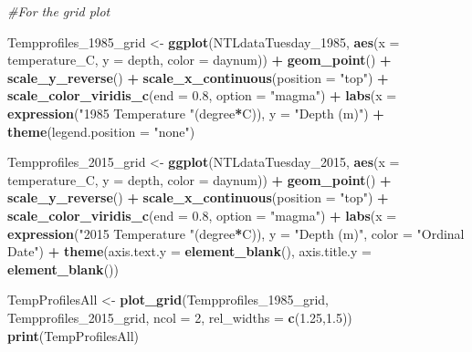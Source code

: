 \documentclass[]{article}
\newenvironment{Shaded}{\begin{snugshade}}{\end{snugshade}}
\newcommand{\CommentTok}[1]{\textcolor[rgb]{0.56,0.35,0.01}{\textit{#1}}}
\newcommand{\DataTypeTok}[1]{\textcolor[rgb]{0.13,0.29,0.53}{#1}}
\newcommand{\DecValTok}[1]{\textcolor[rgb]{0.00,0.00,0.81}{#1}}
\newcommand{\FloatTok}[1]{\textcolor[rgb]{0.00,0.00,0.81}{#1}}
\newcommand{\KeywordTok}[1]{\textcolor[rgb]{0.13,0.29,0.53}{\textbf{#1}}}
\newcommand{\NormalTok}[1]{#1}
\newcommand{\OperatorTok}[1]{\textcolor[rgb]{0.81,0.36,0.00}{\textbf{#1}}}
\newcommand{\StringTok}[1]{\textcolor[rgb]{0.31,0.60,0.02}{#1}}
\begin{document}
\begin{Shaded}
\begin{Highlighting}[]
\CommentTok{#For the grid plot}

\NormalTok{Tempprofiles_}\DecValTok{1985}\NormalTok{_grid <-}\StringTok{ }
\StringTok{  }\KeywordTok{ggplot}\NormalTok{(NTLdataTuesday_}\DecValTok{1985}\NormalTok{, }
         \KeywordTok{aes}\NormalTok{(}\DataTypeTok{x =}\NormalTok{ temperature_C, }\DataTypeTok{y =}\NormalTok{ depth, }\DataTypeTok{color =}\NormalTok{ daynum)) }\OperatorTok{+}
\StringTok{  }\KeywordTok{geom_point}\NormalTok{() }\OperatorTok{+}
\StringTok{  }\KeywordTok{scale_y_reverse}\NormalTok{() }\OperatorTok{+}
\StringTok{  }\KeywordTok{scale_x_continuous}\NormalTok{(}\DataTypeTok{position =} \StringTok{"top"}\NormalTok{) }\OperatorTok{+}
\StringTok{  }\KeywordTok{scale_color_viridis_c}\NormalTok{(}\DataTypeTok{end =} \FloatTok{0.8}\NormalTok{, }\DataTypeTok{option =} \StringTok{"magma"}\NormalTok{) }\OperatorTok{+}\StringTok{ }
\StringTok{  }\KeywordTok{labs}\NormalTok{(}\DataTypeTok{x =} \KeywordTok{expression}\NormalTok{(}\StringTok{"1985 Temperature "}\NormalTok{(degree}\OperatorTok{*}\NormalTok{C)), }\DataTypeTok{y =} \StringTok{"Depth (m)"}\NormalTok{) }\OperatorTok{+}
\StringTok{  }\KeywordTok{theme}\NormalTok{(}\DataTypeTok{legend.position =} \StringTok{"none"}\NormalTok{)}

\NormalTok{Tempprofiles_}\DecValTok{2015}\NormalTok{_grid <-}\StringTok{ }
\StringTok{  }\KeywordTok{ggplot}\NormalTok{(NTLdataTuesday_}\DecValTok{2015}\NormalTok{, }
         \KeywordTok{aes}\NormalTok{(}\DataTypeTok{x =}\NormalTok{ temperature_C, }\DataTypeTok{y =}\NormalTok{ depth, }\DataTypeTok{color =}\NormalTok{ daynum)) }\OperatorTok{+}
\StringTok{  }\KeywordTok{geom_point}\NormalTok{() }\OperatorTok{+}
\StringTok{  }\KeywordTok{scale_y_reverse}\NormalTok{() }\OperatorTok{+}
\StringTok{  }\KeywordTok{scale_x_continuous}\NormalTok{(}\DataTypeTok{position =} \StringTok{"top"}\NormalTok{) }\OperatorTok{+}
\StringTok{  }\KeywordTok{scale_color_viridis_c}\NormalTok{(}\DataTypeTok{end =} \FloatTok{0.8}\NormalTok{, }\DataTypeTok{option =} \StringTok{"magma"}\NormalTok{) }\OperatorTok{+}\StringTok{ }
\StringTok{  }\KeywordTok{labs}\NormalTok{(}\DataTypeTok{x =} \KeywordTok{expression}\NormalTok{(}\StringTok{"2015 Temperature "}\NormalTok{(degree}\OperatorTok{*}\NormalTok{C)), }\DataTypeTok{y =} \StringTok{"Depth (m)"}\NormalTok{, }
       \DataTypeTok{color =} \StringTok{"Ordinal Date"}\NormalTok{) }\OperatorTok{+}
\StringTok{  }\KeywordTok{theme}\NormalTok{(}\DataTypeTok{axis.text.y =} \KeywordTok{element_blank}\NormalTok{(), }\DataTypeTok{axis.title.y =} \KeywordTok{element_blank}\NormalTok{())}

\NormalTok{TempProfilesAll <-}\StringTok{ }
\StringTok{  }\KeywordTok{plot_grid}\NormalTok{(Tempprofiles_}\DecValTok{1985}\NormalTok{_grid, Tempprofiles_}\DecValTok{2015}\NormalTok{_grid,}
            \DataTypeTok{ncol =} \DecValTok{2}\NormalTok{, }\DataTypeTok{rel_widths =} \KeywordTok{c}\NormalTok{(}\FloatTok{1.25}\NormalTok{,}\FloatTok{1.5}\NormalTok{))}
\KeywordTok{print}\NormalTok{(TempProfilesAll)}
\end{Highlighting}
\end{Shaded}
\end{document}
